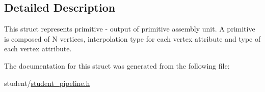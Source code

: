 \subsection{Detailed Description}
This struct represents primitive -\/ output of primitive assembly unit. A primitive is composed of N vertices, interpolation type for each vertex attribute and type of each vertex attribute. 

The documentation for this struct was generated from the following file\-:\begin{DoxyCompactItemize}
\item 
student/\hyperlink{student__pipeline_8h}{student\-\_\-pipeline.\-h}\end{DoxyCompactItemize}
